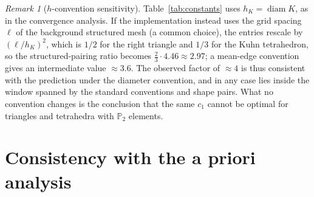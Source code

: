 \documentclass[11pt,a4paper]{article}
\theoremstyle{remark}
\newtheorem{remark}{Remark}
\newcommand{\PP}{\mathbb{P}}
\begin{document}
\begin{remark}[$h$-convention sensitivity]
\label{rem:hconv}
Table~\ref{tab:constants} uses $h_K = \operatorname{diam} K$, as in the
convergence analysis. If the implementation instead uses the grid
spacing $\ell$ of the background structured mesh (a common choice),
the entries rescale by $(\ell/h_K)^2$, which is $1/2$ for the right
triangle and $1/3$ for the Kuhn tetrahedron, so the structured-pairing
ratio becomes $\tfrac23 \cdot 4.46 \approx 2.97$; a mean-edge
convention gives an intermediate value $\approx 3.6$. The observed
factor of $\approx 4$ is thus consistent with the prediction under the
diameter convention, and in any case lies inside the window spanned by
the standard conventions and shape pairs. What no convention changes
is the conclusion that the same $c_1$ cannot be optimal for triangles
and tetrahedra with $\PP_2$ elements.
\end{remark}

\section{Consistency with the a priori analysis}
\label{sec:consistency}
\end{document}
